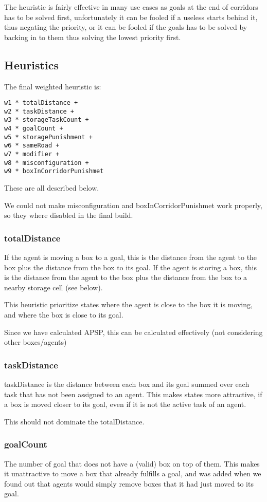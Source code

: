 \documentclass[letterpaper]{article}
\begin{document}
The heuristic is fairly effective in many use cases as goals at the end of
corridors has to be solved first, unfortunately it can be fooled if a useless
starts behind it, thus negating the priority, or it can be fooled if the goals
has to be solved by backing in to them thus solving the lowest priority first.

\subsection{Heuristics}
The final weighted heuristic is:
\begin{verbatim}
w1 * totalDistance +
w2 * taskDistance +
w3 * storageTaskCount +
w4 * goalCount +
w5 * storagePunishment +
w6 * sameRoad +
w7 * modifier +
w8 * misconfiguration +
w9 * boxInCorridorPunishmet
\end{verbatim}
These are all described below.

We could not make misconfiguration and boxInCorridorPunishmet
work properly, so they where disabled in the final build.

\subsubsection{totalDistance}
If the agent is moving a box to a goal, this is the distance from the agent
to the box plus the distance from the box to its goal. If the agent is storing
a box, this is the distance from the agent to the box plus the distance from the
box to a nearby storage cell (see below).

This heuristic prioritize states where the agent is close to the box it is moving,
and where the box is close to its goal.

Since we have calculated APSP, this can be calculated effectively (not considering other boxes/agents)\\

\subsubsection{taskDistance}
taskDistance is the distance between each box and its goal summed over each task
that has not been assigned to an agent. This makes states more attractive, if
a box is moved closer to its goal, even if it is not the active task of an agent.

This should not dominate the totalDistance.

\subsubsection{goalCount}
The number of goal that does not have a (valid) box on top of them. This makes it
unattractive to move a box that already fulfills a goal, and was added when we found
out that agents would simply remove boxes that it had just moved to its goal.
\end{document}
